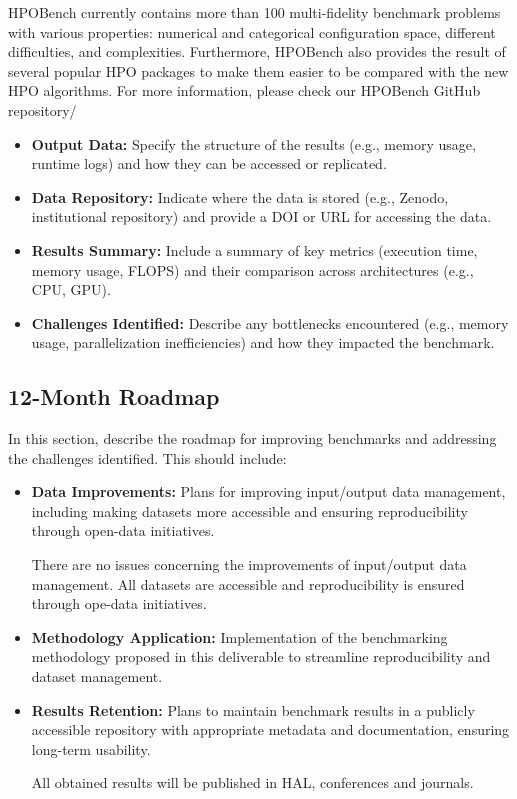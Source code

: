 HPOBench currently contains more than 100 multi-fidelity benchmark problems with various properties: numerical and categorical configuration space, different difficulties, and complexities. Furthermore, HPOBench also provides the result of several popular HPO packages to make them easier to be compared with the new HPO algorithms. For more information, please check our HPOBench GitHub repository/

\begin{itemize}
\item \textbf{Output Data:} Specify the structure of the results (e.g., memory usage, runtime logs) and how they can be accessed or replicated.

\item \textbf{Data Repository:} Indicate where the data is stored (e.g., Zenodo, institutional repository) and provide a DOI or URL for accessing the data.

\item \textbf{Results Summary:} Include a summary of key metrics (execution time, memory usage, FLOPS) and their comparison across architectures (e.g., CPU, GPU).

\item \textbf{Challenges Identified:} Describe any bottlenecks encountered (e.g., memory usage, parallelization inefficiencies) and how they impacted the benchmark.
\end{itemize}

\subsection{12-Month Roadmap}
\label{sec:WP5:Zellij:roadmap}

In this section, describe the roadmap for improving benchmarks and addressing the challenges identified. This should include:
\begin{itemize}

\item \textbf{Data Improvements:} Plans for improving input/output data management, including making datasets more accessible and ensuring reproducibility through open-data initiatives.

There are no issues concerning the improvements of input/output data management. All datasets are accessible and reproducibility is ensured through ope-data initiatives.

\item \textbf{Methodology Application:} Implementation of the benchmarking methodology proposed in this deliverable to streamline reproducibility and dataset management.

\item \textbf{Results Retention:} Plans to maintain benchmark results in a publicly accessible repository with appropriate metadata and documentation, ensuring long-term usability.

All obtained results will be published in HAL, conferences and journals.

\end{itemize}

